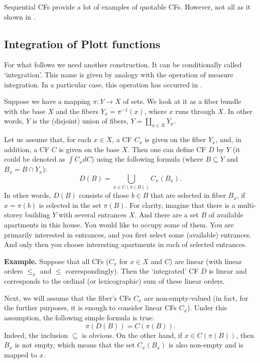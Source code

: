 \documentclass[12pt,a4paper]{article}
\begin{document}
Sequential CFs provide a lot of examples of quotable CFs. However, not all as it shown in \cite{CY}.

\subsection{Integration of Plott functions}

For what follows we need another construction. It can be conditionally called `integration'. This name is given by analogy with the operation of measure integration. In a particular case, this operation has occurred in \cite{DK}.

Suppose we have a mapping $\pi :Y\to X$ of sets. We look at it as a fiber bundle with the base $X$ and the fibers $Y_x=\pi ^{-1}(x)$, where $x$ runs through $X$. In other words, $Y$ is the (disjoint) union of fibers, $Y=\coprod_{x\in X} Y_x$.

Let us assume that, for each $x\in X$, a CF $C_x$ is given on the fiber $Y_x$, and, in addition, a CF $C$ is given on the base $X$. Then one can define CF $D$ by $Y$ (it could be denoted as $\int C_xdC$) using the following formula (where $B\subseteq Y$ and $B_x=B\cap Y_x$):
          \begin{equation}\label{int}
D(B)=\bigcup _{x\in C(\pi (B))} C_x(B_x).
          \end{equation}
In other words, $D(B)$ consists of those $b\in B$ that are selected in fiber $B_x$, if $x=\pi(b)$ is selected in the set $\pi(B)$. For clarity, imagine that there is a multi-storey building $Y$ with several entrances $X$. And there are a set $B$ of available apartments in this house. You would like to occupy some of them. You are primarily interested in entrances, and you first select some (available) entrances. And only then you choose interesting apartments in each of selected entrances.\medskip

\textbf{Example.} Suppose that all CFs ($C_x$ for $x\in X$ and $C$) are linear (with linear orders $\le_x$ and $\le$ correspondingly). Then the `integrated' CF $D$ is linear and corresponds to the ordinal (or lexicographic) sum of these linear orders. \medskip

Next, we will assume that the fiber's CFs $C_x$ are non-empty-valued (in fact, for the further purposes, it is enough to consider linear CFs $C_x$). Under this assumption, the following simple formula is true:
    \begin{equation}\label{pro}
                                 \pi (D(B))=C(\pi (B)).
    \end{equation}
Indeed, the inclusion $\subseteq$ is obvious. On the other hand, if       $x\in C(\pi (B))$, then $B_x$ is not empty, which means that the set $C_x(B_x)$ is also non-empty and is mapped to $x$.
\end{document}
